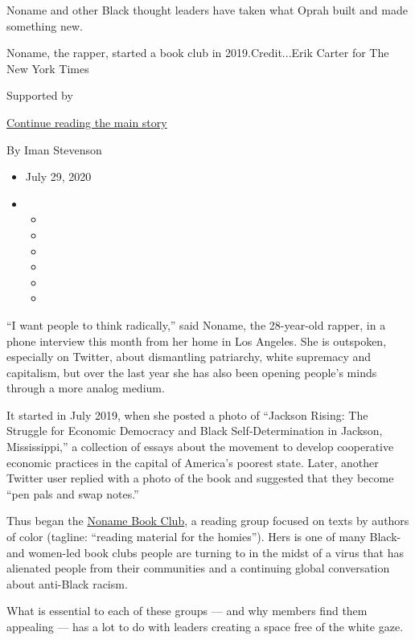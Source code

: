Noname and other Black thought leaders have taken what Oprah built and
made something new.

Noname, the rapper, started a book club in 2019.Credit...Erik Carter for
The New York Times

Supported by

\protect\hyperlink{after-sponsor}{Continue reading the main story}

By Iman Stevenson

\begin{itemize}
\item
  July 29, 2020
\item
  \begin{itemize}
  \item
  \item
  \item
  \item
  \item
  \item
  \end{itemize}
\end{itemize}

``I want people to think radically,'' said Noname, the 28-year-old
rapper, in a phone interview this month from her home in Los Angeles.
She is outspoken, especially on Twitter, about dismantling patriarchy,
white supremacy and capitalism, but over the last year she has also been
opening people's minds through a more analog medium.

It started in July 2019, when she posted a photo of ``Jackson Rising:
The Struggle for Economic Democracy and Black Self‑Determination in
Jackson, Mississippi,'' a collection of essays about the movement to
develop cooperative economic practices in the capital of America's
poorest state. Later, another Twitter user replied with a photo of the
book and suggested that they become ``pen pals and swap notes.''

Thus began the
\href{https://www.instagram.com/nonamereads/?hl=en}{Noname Book Club}, a
reading group focused on texts by authors of color (tagline: ``reading
material for the homies''). Hers is one of many Black- and women-led
book clubs people are turning to in the midst of a virus that has
alienated people from their communities and a continuing global
conversation about anti-Black racism.

What is essential to each of these groups --- and why members find them
appealing --- has a lot to do with leaders creating a space free of the
white gaze.

